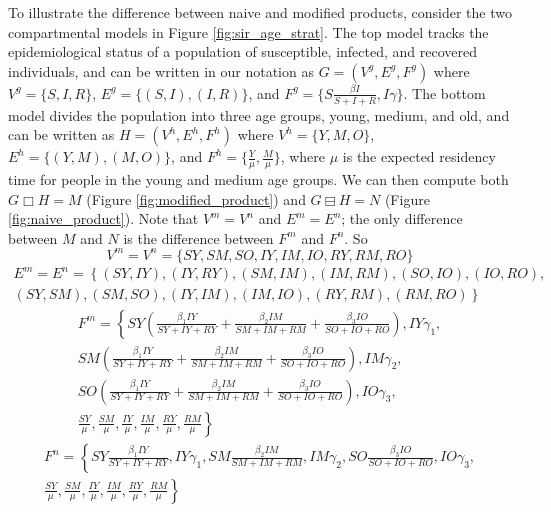 \documentclass[pdflatex,sn-basic]{sn-jnl}%
\theoremstyle{definition}
\begin{document}
To illustrate the difference between naive and modified products, consider the two compartmental models in Figure \ref{fig:sir_age_strat}. The top model tracks the epidemiological status of a population of susceptible, infected, and recovered individuals, and can be written in our notation as $G = (V^g, E^g, F^g)$ where $V^g = \{ S, I, R\}$, $E^g=\{(S, I), (I, R)\}$, and $F^g = \{S\frac{\beta I}{S+I+R}, I\gamma \}$. The bottom model divides the population into three age groups, young, medium, and old, and can be written as $H = (V^h, E^h, F^h)$ where $V^h = \{Y, M, O\}$, $E^h = \{(Y, M), (M, O)\}$, and $F^h = \{\frac{Y}{\mu}, \frac{M}{\mu}\}$, where $\mu$ is the expected residency time for people in the young and medium age groups. We can then compute both $G\Box H = M$ (Figure \ref{fig:modified_product}) and $G\boxminus H = N$ (Figure \ref{fig:naive_product}). Note that $V^m = V^n$ and $E^m = E^n$; the only difference between $M$ and $N$ is the difference between $F^m$ and $F^n$. So
    \begin{equation}
        V^m = V^n = \{SY, SM, SO, IY, IM, IO, RY, RM, RO\}
    \end{equation}
    \begin{multline}
        E^m = E^n = \left\{ (SY, IY), (IY, RY), (SM, IM), (IM, RM), (SO, IO), (IO, RO), \right.\\ \left. (SY, SM), (SM, SO), (IY, IM), (IM, IO), (RY, RM), (RM, RO)\right\}
    \end{multline}
    \begin{multline}\label{normex1}
        F^m = \left\{SY\left(\frac{\beta_1 IY}{SY+IY+RY} + \frac{\beta_2 IM}{SM+IM+RM}+\frac{\beta_3 IO}{SO+IO+RO}\right), IY\gamma_1,\right.\\ \left.SM\left(\frac{\beta_1 IY}{SY+IY+RY} + \frac{\beta_2 IM}{SM+IM+RM}+\frac{\beta_3 IO}{SO+IO+RO}\right) ,IM\gamma_2,\right. \\ \left. SO\left(\frac{\beta_1 IY}{SY+IY+RY} + \frac{\beta_2 IM}{SM+IM+RM}+\frac{\beta_3 IO}{SO+IO+RO}\right), IO\gamma_3,\right. \\ \left.  \frac{SY}{\mu}, \frac{SM}{\mu}, \frac{IY}{\mu}, \frac{IM}{\mu}, \frac{RY}{\mu}, \frac{RM}{\mu} \right\}
    \end{multline}
    \begin{multline}\label{normex2}
        F^n = \left\{SY\frac{\beta_1 IY}{SY+IY+RY}, IY\gamma_1,  SM\frac{\beta_2 IM}{SM+IM+RM}, IM\gamma_2, SO\frac{\beta_3 IO}{SO+IO+RO}, IO\gamma_3,\right. \\ \left. \frac{SY}{\mu}, \frac{SM}{\mu}, \frac{IY}{\mu}, \frac{IM}{\mu}, \frac{RY}{\mu}, \frac{RM}{\mu} \right\}
    \end{multline}
\end{document}
